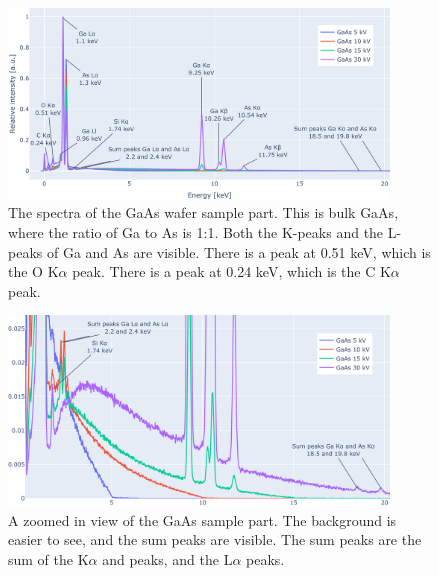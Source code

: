 \begin{figure}[p] %
    \centering
    \includegraphics[width=0.90\textwidth]{figures/each_spectra_not_on_github/GaAs_everything.png}
    \caption{
        The spectra of the GaAs wafer sample part.
        This is bulk GaAs, where the ratio of Ga to As is 1:1.
        Both the K-peaks and the L-peaks of Ga and As are visible.
        There is a peak at 0.51 keV, which is the O K$\alpha$ peak.
        There is a peak at 0.24 keV, which is the C K$\alpha$ peak.
    }
    \label{fig:results:Spectra_GaAs}
\end{figure}


\begin{figure}[p]
    \centering
    \includegraphics[width=0.90\textwidth]{figures/each_spectra_not_on_github/GaAs_bg_and_sum_peaks.png}
    \caption{
        A zoomed in view of the GaAs sample part.
        The background is easier to see, and the sum peaks are visible.
        The sum peaks are the sum of the K$\alpha$ and peaks, and the L$\alpha$ peaks.
    }
    \label{fig:results:Spectra_GaAs_bg_and_sum_peaks}
\end{figure}


